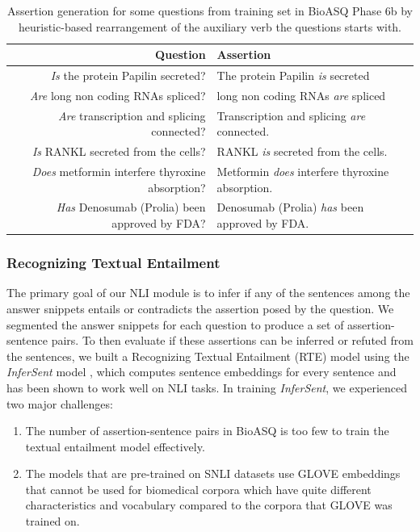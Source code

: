 \begin{table}[t!]
    \centering
    \begin{tabular}{r l} \hline
        Question & Assertion \\ \hline
    \textit{Is} the protein Papilin secreted? & The protein Papilin \textit{is} secreted \\
    \textit{Are} long non coding RNAs spliced? & 
    long non coding RNAs \textit{are} spliced \\
    \textit{Are} transcription and splicing connected? &
    Transcription and splicing \textit{are} connected. \\
    \textit{Is} RANKL secreted from the cells? &
    RANKL \textit{is} secreted from the cells. \\
    \textit{Does} metformin interfere thyroxine absorption? & 
    Metformin \textit{does} interfere thyroxine absorption. \\
    \textit{Has} Denosumab (Prolia) been approved by FDA? &
    Denosumab (Prolia) \textit{has} been approved by FDA. \\
    \hline
   \end{tabular}
    \caption{Assertion generation for some questions from training set in BioASQ Phase 6b by heuristic-based rearrangement of the auxiliary verb the questions starts with.}    \label{tab:assertion_examples}
\end{table}

\subsubsection{Recognizing Textual Entailment}

The primary goal of our NLI module is to infer if any of the sentences among the answer snippets entails or contradicts the assertion posed by the question. We segmented the answer snippets for each question to produce a set of assertion-sentence pairs. To then evaluate if these assertions can be inferred or refuted from the sentences, we built a Recognizing Textual Entailment (RTE) model using the \textit{InferSent} model \cite{Infersent}, which computes sentence embeddings for every sentence and has been shown to work well on NLI tasks. In training \textit{InferSent}, we experienced two major challenges:

\begin{enumerate}
    \item The number of assertion-sentence pairs in BioASQ is too few to train the textual entailment model effectively.
    \item The models that are pre-trained on SNLI \cite{snli}
    datasets use GLOVE \cite{glove} embeddings that cannot be used for biomedical corpora which have quite different characteristics and vocabulary compared to the corpora that GLOVE was trained on.
\end{enumerate}

